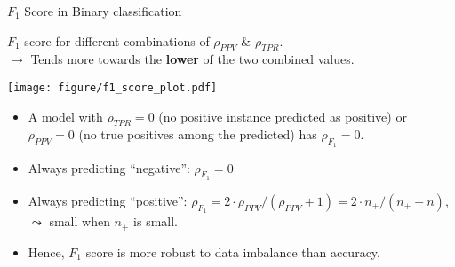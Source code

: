 \documentclass[11pt,compress,t,notes=noshow, xcolor=table]{beamer}
\newcommand{\np}{n_{+}} %
\begin{document}
\begin{vbframe}{$F_1$ Score in Binary classification}
	\footnotesize
	
	\begin{minipage}[c]{0.5\textwidth}
		\footnotesize
		$F_1$ score for different combinations of $\rho_{PPV}$ \& $\rho_{TPR}$. \\
		$\rightarrow$ Tends more towards the \textbf{lower} of the two combined values.
	\end{minipage}%
	\begin{minipage}[c]{0.5\textwidth}
		\centering
		\texttt{[image: figure/f1\_score\_plot.pdf]}
	\end{minipage}
	
	\begin{itemize}
		\item A model with $\rho_{TPR} = 0$ (no positive instance predicted as 
		positive) or 
		$\rho_{PPV} = 0$ (no true positives among the predicted) has $\rho_{F_1} = 0$.
  
		\item Always predicting \enquote{negative}: $\rho_{F_1} = 0$
  
		\item Always predicting \enquote{positive}: $\rho_{F_1} = 2 \cdot \rho_{PPV} / 
		(\rho_{PPV} + 1) = 2 \cdot \np / (\np + n)$,\\ 
		$\leadsto$ small when $\np$ is small.

        \item Hence, $F_1$ score is more robust to data imbalance than accuracy.
  
	\end{itemize}
	
\end{vbframe}
\end{document}
